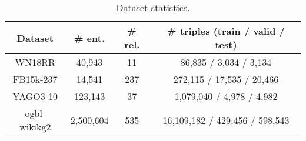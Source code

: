 \documentclass{article}
\begin{document}
\begin{table}[!t]
\color{black}
\setlength\tabcolsep{3pt}
\centering
\begin{tabular}{ c c c c }
\toprule
Dataset & \# ent. & \# rel. & \# triples (train / valid / test) 
\\
\midrule
WN18RR    &40,943 &11 &86,835 / 3,034 / 3,134 
\\
FB15k-237 &14,541 &237 &272,115 / 17,535 / 20,466 
\\
YAGO3-10 &123,143 &37 &1,079,040 / 4,978 / 4,982
\\ \midrule
ogbl-wikikg2 & 2,500,604 & 535 & 16,109,182 / 429,456 / 598,543
\\
\bottomrule
\end{tabular}
\caption{Dataset statistics.}
\label{table:dataset}
\end{table}
\end{document}
